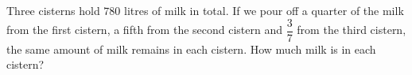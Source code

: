 Three cisterns hold $780$ litres of milk in total. If we pour off a quarter of the milk from the first cistern, a fifth from the second cistern and $\dfrac{3}{7}$ from the third cistern, the same amount of milk remains in each cistern. How much milk is in each cistern?
